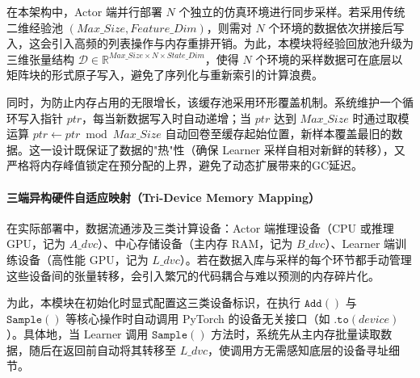 在本架构中，Actor 端并行部署 $N$ 个独立的仿真环境进行同步采样。若采用传统二维经验池 $(Max\_Size, Feature\_Dim)$，则需对 $N$ 个环境的数据依次拼接后写入，这会引入高频的列表操作与内存重排开销。为此，本模块将经验回放池升级为三维张量结构 $\mathcal{D} \in \mathbb{R}^{Max\_Size \times N \times State\_Dim}$，使得 $N$ 个环境的采样数据可在底层以矩阵块的形式原子写入，避免了序列化与重新索引的计算浪费。

同时，为防止内存占用的无限增长，该缓存池采用环形覆盖机制。系统维护一个循环写入指针 $ptr$，每当新数据写入时自动递增；当 $ptr$ 达到 $Max\_Size$ 时通过取模运算 $ptr \leftarrow ptr \bmod Max\_Size$ 自动回卷至缓存起始位置，新样本覆盖最旧的数据。这一设计既保证了数据的"热"性（确保 Learner 采样自相对新鲜的转移），又严格将内存峰值锁定在预分配的上界，避免了动态扩展带来的GC延迟。

\paragraph{三端异构硬件自适应映射（Tri-Device Memory Mapping）}

在实际部署中，数据流通涉及三类计算设备：Actor 端推理设备（CPU 或推理 GPU，记为 $A\_dvc$）、中心存储设备（主内存 RAM，记为 $B\_dvc$）、Learner 端训练设备（高性能 GPU，记为 $L\_dvc$）。若在数据入库与采样的每个环节都手动管理这些设备间的张量转移，会引入繁冗的代码耦合与难以预测的内存碎片化。

为此，本模块在初始化时显式配置这三类设备标识，在执行 $\texttt{Add}()$ 与 $\texttt{Sample}()$ 等核心操作时自动调用 PyTorch 的设备无关接口（如 $\texttt{.to}(device)$）。具体地，当 Learner 调用 $\texttt{Sample}()$ 方法时，系统先从主内存批量读取数据，随后在返回前自动将其转移至 $L\_dvc$，使调用方无需感知底层的设备寻址细节。

